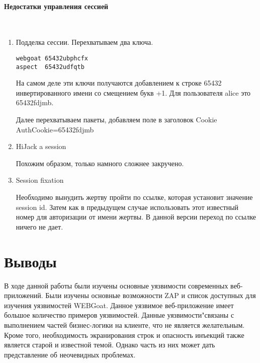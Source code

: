 \documentclass{article}
\begin{document}
\paragraph{Недостатки управления сессией}
~

\begin{enumerate}

\item Подделка сессии. Перехватываем два ключа.

\begin{verbatim}
webgoat 65432ubphcfx
aspect  65432udfqtb
\end{verbatim}

На самом деле эти ключи получаются добавлением к строке 65432 инвертированного имени со смещением букв +1. Для пользователя alice это 65432fdjmb.

Далее перехватываем пакеты, добавляем поле в заголовок Cookie AuthCookie=65432fdjmb

\item HiJack a session

Похожим образом, только намного сложнее закручено.

\item Session fixation

Необходимо вынудить жертву пройти по ссылке, которая установит значение session id. Затем как в предыдущем случае использовать этот известный номер для авторизации от имени жертвы. В данной версии переход по ссылке ничего не дает.
\end{enumerate}

\section{Выводы}

В ходе данной работы были изучены основные уязвимости современных веб-приложений. Были изучены основные возможности ZAP и список доступных для изучения уязвимостей WEBGoat. Данное уязвимое веб-приложение имеет большое количество примеров уязвимостей. Данные уязвимости"связаны с выполнением частей бизнес-логики на клиенте, что не является желательным. Кроме того, необходимость экранирования строк и опасность инъекций также является старой и известной темой.  Однако часть из них может дать представление об неочевидных проблемах. 
\end{document}
